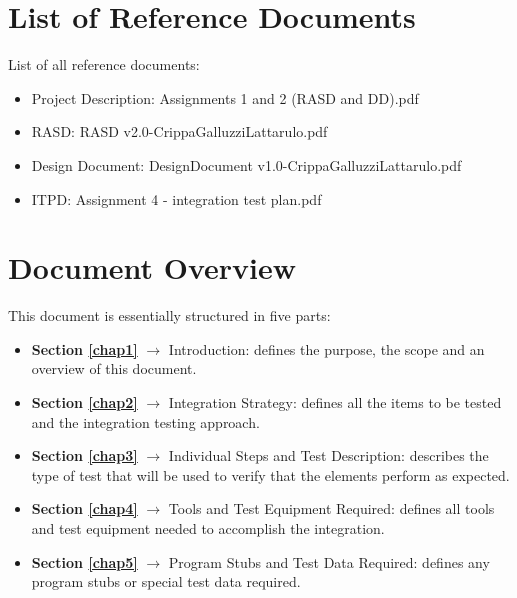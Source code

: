 \section{List of Reference Documents}
List of all reference documents:
\begin{itemize}
	\item Project Description: Assignments 1 and 2 (RASD and DD).pdf
	\item RASD: RASD v2.0-CrippaGalluzziLattarulo.pdf
	\item Design Document: DesignDocument v1.0-CrippaGalluzziLattarulo.pdf
	\item ITPD: Assignment 4 - integration test plan.pdf
\end{itemize}

\section{Document Overview}
This document is essentially structured in five parts:
\begin{itemize}
	\item \textbf{Section \ref{chap1}} $\rightarrow$ Introduction: defines the purpose, the scope and an overview of this document.
	\item \textbf{Section \ref{chap2}} $\rightarrow$ Integration Strategy: defines all the items to be tested and the integration testing approach.
	\item \textbf{Section \ref{chap3}} $\rightarrow$ Individual Steps and Test Description: describes the type of test that will be used to verify that the elements perform as expected.
	\item \textbf{Section \ref{chap4}} $\rightarrow$ Tools and Test Equipment Required: defines all tools and test equipment needed to accomplish the integration.
	\item \textbf{Section \ref{chap5}} $\rightarrow$ Program Stubs and Test Data Required: defines any program stubs or special test data required.
\end{itemize}
